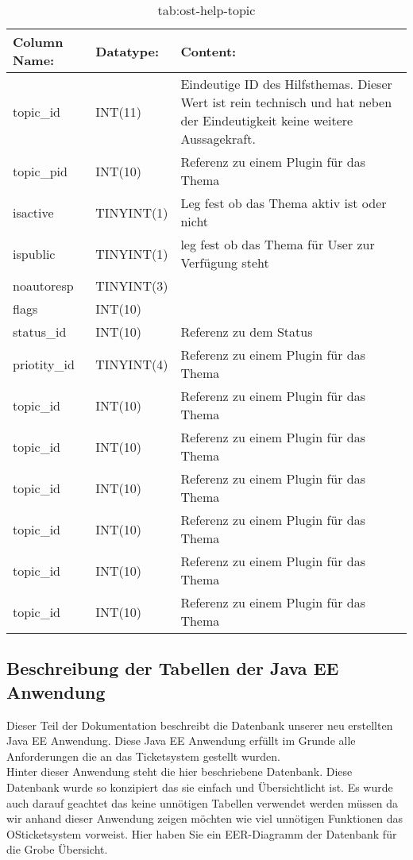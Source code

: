 \begin{table}[h]
	\begin{tabular}{|p{3.5cm}|p{4cm}|p{6.2cm}|}
		\hline
		\textbf{Column Name:} & \textbf{Datatype:} & \textbf{Content:}\\
		\hline
		topic\_id & INT(11) & Eindeutige ID des Hilfsthemas. Dieser Wert ist rein technisch und hat  neben der Eindeutigkeit keine weitere Aussagekraft.\\
		\hline
		topic\_pid & INT(10) & Referenz zu einem Plugin für das Thema\\
		\hline
		isactive & TINYINT(1) & Leg fest ob das Thema aktiv ist oder nicht \\
		\hline
		ispublic & TINYINT(1) & leg fest ob das Thema für User zur Verfügung steht\\
		\hline
		noautoresp & TINYINT(3) & \\
		\hline
		flags & INT(10) & \\
		\hline
		status\_id & INT(10) & Referenz zu dem Status \\
		\hline
		priotity\_id & TINYINT(4) & Referenz zu einem Plugin für das Thema\\
		\hline
		topic\_id & INT(10) & Referenz zu einem Plugin für das Thema\\
		\hline
		topic\_id & INT(10) & Referenz zu einem Plugin für das Thema\\
		\hline
		topic\_id & INT(10) & Referenz zu einem Plugin für das Thema\\
		\hline
		topic\_id & INT(10) & Referenz zu einem Plugin für das Thema\\
		\hline
		topic\_id & INT(10) & Referenz zu einem Plugin für das Thema\\
		\hline
		topic\_id & INT(10) & Referenz zu einem Plugin für das Thema\\
		\hline
		
	\end{tabular}
	\caption{tab:ost-help-topic}
\end{table}
\label{tab:ost_help_topic}

\newpage

\subsection{Beschreibung der Tabellen der Java EE Anwendung}
Dieser Teil der Dokumentation beschreibt die Datenbank unserer neu erstellten Java EE Anwendung. Diese Java EE Anwendung erfüllt im Grunde alle Anforderungen die an das Ticketsystem gestellt wurden.\\
Hinter dieser Anwendung steht die hier beschriebene Datenbank. Diese Datenbank wurde so konzipiert das sie einfach und Übersichtlicht ist. Es wurde auch darauf geachtet das keine unnötigen Tabellen verwendet werden müssen da wir anhand dieser Anwendung zeigen möchten wie viel unnötigen Funktionen das OSticketsystem vorweist.
Hier haben Sie ein EER-Diagramm der Datenbank für die Grobe Übersicht.

